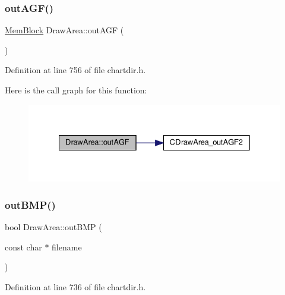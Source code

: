 \subsubsection{\texorpdfstring{out\+A\+G\+F()}{outAGF()}\hspace{0.1cm}{\footnotesize\ttfamily [2/2]}}
{\footnotesize\ttfamily \hyperlink{class_mem_block}{Mem\+Block} Draw\+Area\+::out\+A\+GF (\begin{DoxyParamCaption}{ }\end{DoxyParamCaption})\hspace{0.3cm}{\ttfamily [inline]}}



Definition at line 756 of file chartdir.\+h.

Here is the call graph for this function\+:
\nopagebreak
\begin{figure}[H]
\begin{center}
\leavevmode
\includegraphics[width=328pt]{class_draw_area_a503e5378dd94d121834067ebe61db5e7_cgraph}
\end{center}
\end{figure}
\mbox{\label{class_draw_area_aa1a273e311c36f86f78943cc1d3ffff9}} 
\subsubsection{\texorpdfstring{out\+B\+M\+P()}{outBMP()}\hspace{0.1cm}{\footnotesize\ttfamily [1/3]}}
{\footnotesize\ttfamily bool Draw\+Area\+::out\+B\+MP (\begin{DoxyParamCaption}\item[{const char $\ast$}]{filename }\end{DoxyParamCaption})\hspace{0.3cm}{\ttfamily [inline]}}



Definition at line 736 of file chartdir.\+h.

